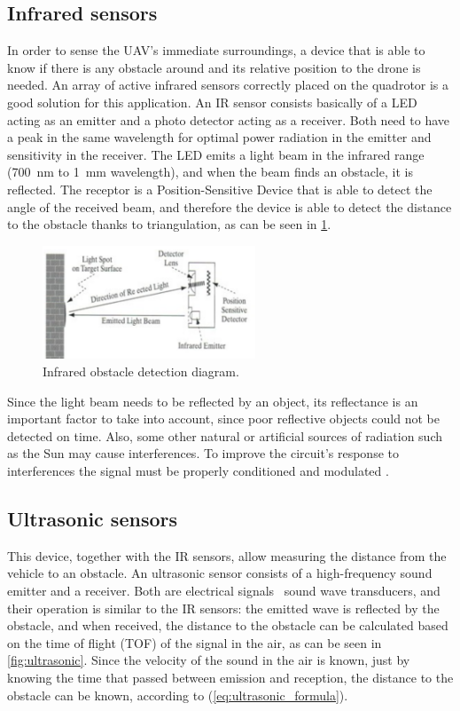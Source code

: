 \documentclass[journal]{IEEEtran}
\begin{document}
	\subsection{Infrared sensors}
	In order to sense the UAV's immediate surroundings, a device that is able to know if there is any obstacle around and its relative position to the drone is needed. An array of active infrared sensors correctly placed on the quadrotor is a good solution for this application. An IR sensor consists basically of a LED acting as an emitter and a photo detector acting as a receiver. Both need to have a peak in the same wavelength for optimal power radiation in the emitter and sensitivity in the receiver. The LED emits a light beam in the infrared range (\SI{700}{\nano \meter} to \SI{1}{\milli \meter} wavelength), and when the beam finds an obstacle, it is reflected. The receptor is a Position-Sensitive Device that is able to detect the angle of the received beam, and therefore the device is able to detect the distance to the obstacle thanks to triangulation, as can be seen in \figurename{ \ref{fig:ir}}.
	\begin{figure}[H]
		\centering
		\includegraphics[width=2.5in]{ir}
		\caption{Infrared obstacle detection diagram.}
		\label{fig:ir}
	\end{figure}
	Since the light beam needs to be reflected by an object, its reflectance is an important factor to take into account, since poor reflective objects could not be detected on time.  Also, some other natural or artificial sources of radiation such as the Sun may cause interferences. To improve the circuit's response to interferences the signal must be properly conditioned and modulated \cite{mod_control_bresciani, remotecontrol}.
	
	\subsection{Ultrasonic sensors}
	This device, together with the IR sensors, allow measuring the distance from the vehicle to an obstacle. An ultrasonic sensor consists of a high-frequency sound emitter and a receiver. Both are electrical signals \textendash \ sound wave transducers, and their operation is similar to the IR sensors: the emitted wave is reflected by the obstacle, and when received, the distance to the obstacle can be calculated based on the time of flight (TOF) of the signal in the air, as can be seen in \figurename{} \ref{fig:ultrasonic}. Since the velocity of the sound in the air is known, just by knowing the time that passed between emission and reception, the distance to the obstacle can be known, according to (\ref{eq:ultrasonic_formula}). 
	
\end{document}
